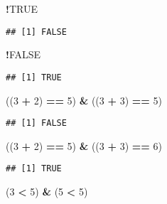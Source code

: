 \documentclass[]{book}
\newenvironment{Shaded}{\begin{snugshade}}{\end{snugshade}}
\newcommand{\DecValTok}[1]{\textcolor[rgb]{0.00,0.00,0.81}{#1}}
\newcommand{\StringTok}[1]{\textcolor[rgb]{0.31,0.60,0.02}{#1}}
\newcommand{\OtherTok}[1]{\textcolor[rgb]{0.56,0.35,0.01}{#1}}
\newcommand{\OperatorTok}[1]{\textcolor[rgb]{0.81,0.36,0.00}{\textbf{#1}}}
\newcommand{\NormalTok}[1]{#1}
\theoremstyle{definition}
\theoremstyle{definition}
\theoremstyle{definition}
\theoremstyle{remark}
\begin{document}
\begin{Shaded}
\begin{Highlighting}[]
\OperatorTok{!}\OtherTok{TRUE}
\end{Highlighting}
\end{Shaded}

\begin{verbatim}
## [1] FALSE
\end{verbatim}

\begin{Shaded}
\begin{Highlighting}[]
\OperatorTok{!}\OtherTok{FALSE}
\end{Highlighting}
\end{Shaded}

\begin{verbatim}
## [1] TRUE
\end{verbatim}

\begin{Shaded}
\begin{Highlighting}[]
\NormalTok{((}\DecValTok{3} \OperatorTok{+}\StringTok{ }\DecValTok{2}\NormalTok{) }\OperatorTok{==}\StringTok{ }\DecValTok{5}\NormalTok{) }\OperatorTok{&}\StringTok{ }\NormalTok{((}\DecValTok{3} \OperatorTok{+}\StringTok{ }\DecValTok{3}\NormalTok{) }\OperatorTok{==}\StringTok{ }\DecValTok{5}\NormalTok{)}
\end{Highlighting}
\end{Shaded}

\begin{verbatim}
## [1] FALSE
\end{verbatim}

\begin{Shaded}
\begin{Highlighting}[]
\NormalTok{((}\DecValTok{3} \OperatorTok{+}\StringTok{ }\DecValTok{2}\NormalTok{) }\OperatorTok{==}\StringTok{ }\DecValTok{5}\NormalTok{) }\OperatorTok{&}\StringTok{ }\NormalTok{((}\DecValTok{3} \OperatorTok{+}\StringTok{ }\DecValTok{3}\NormalTok{) }\OperatorTok{==}\StringTok{ }\DecValTok{6}\NormalTok{)}
\end{Highlighting}
\end{Shaded}

\begin{verbatim}
## [1] TRUE
\end{verbatim}

\begin{Shaded}
\begin{Highlighting}[]
\NormalTok{(}\DecValTok{3} \OperatorTok{<}\StringTok{ }\DecValTok{5}\NormalTok{) }\OperatorTok{&}\StringTok{ }\NormalTok{(}\DecValTok{5} \OperatorTok{<}\StringTok{ }\DecValTok{5}\NormalTok{)}
\end{Highlighting}
\end{Shaded}
\end{document}
